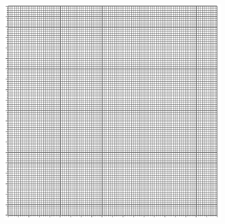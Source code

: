 \documentclass[UTF8]{article}
\begin{document}
\begin{figure}[H]\centering
\includegraphics[width=0.65\columnwidth]{assets/100x100.pdf}
\end{figure}
\end{document}
